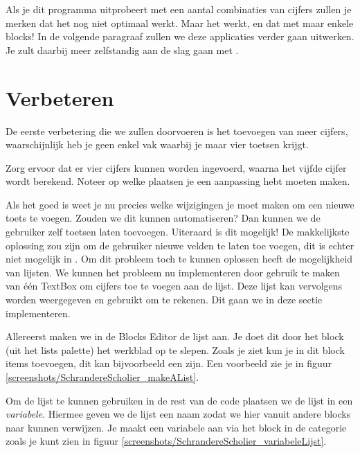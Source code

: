 \runOpTelefoon{}
Als je dit programma uitprobeert met een aantal combinaties van cijfers zullen je merken dat het nog niet optimaal werkt. Maar het werkt, en dat met maar enkele blocks! In de volgende paragraaf zullen we deze applicaties verder gaan uitwerken. Je zult daarbij meer zelfstandig aan de slag gaan met \ai.

\section{Verbeteren}
De eerste verbetering die we zullen doorvoeren is het toevoegen van meer cijfers, waarschijnlijk heb je geen enkel vak waarbij je maar vier toetsen krijgt. 

 \begin{opgave}
    \opgVraag
Zorg ervoor dat er vier cijfers kunnen worden ingevoerd, waarna het vijfde cijfer wordt berekend. Noteer op welke plaatsen je een aanpassing hebt moeten maken.
\end{opgave}

Als het goed is weet je nu precies welke wijzigingen je moet maken om een nieuwe toets te voegen. Zouden we dit kunnen automatiseren? Dan kunnen we de gebruiker zelf toetsen laten toevoegen. Uiteraard is dit mogelijk! De makkelijkste oplossing zou zijn om de gebruiker nieuwe velden te laten toe voegen, dit is echter niet mogelijk in \ai. Om dit probleem toch te kunnen oplossen heeft \ai de mogelijkheid van lijsten. We kunnen het probleem nu implementeren door gebruik te maken van \'e\'en TextBox om cijfers toe te voegen aan de lijst. Deze lijst kan vervolgens worden weergegeven en gebruikt om te rekenen. Dit gaan we in deze sectie implementeren.

Allereerst maken we in de Blocks Editor de lijst aan. Je doet dit door het  block (uit het lists palette) het werkblad op te slepen. Zoals je ziet kun je in dit block items toevoegen, dit kan bijvoorbeeld een  zijn. Een voorbeeld zie je in figuur \ref{screenshots/SchrandereScholier_makeAList}.

Om de lijst te kunnen gebruiken in de rest van de code plaatsen we de lijst in een \emph{variabele}. Hiermee geven we de lijst een naam zodat we hier vanuit andere blocks naar kunnen verwijzen. Je maakt een variabele aan via het  block in de categorie  zoals je kunt zien in figuur \ref{screenshots/SchrandereScholier_variabeleLijst}. 

